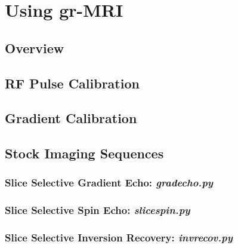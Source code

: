 \documentclass[11pt, oneside]{article}   	%
\begin{document}
\section{Using gr-MRI}
\subsection{Overview}



\subsection{RF Pulse Calibration}



\subsection{Gradient Calibration}



\subsection{Stock Imaging Sequences}
\subsubsection{Slice Selective Gradient Echo: \textit{gradecho.py}}



\subsubsection{Slice Selective Spin Echo: \textit{slicespin.py}}




\subsubsection{Slice Selective Inversion Recovery: \textit{invrecov.py}}
\end{document}
